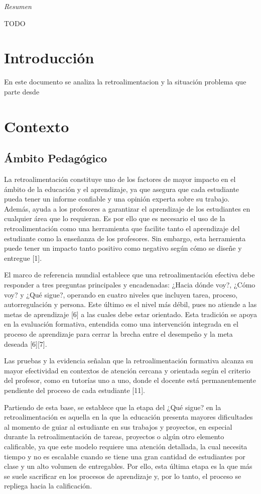 \documentclass[letterpaper, 10 pt, conference]{ieeeconf}
\begin{document}
\thispagestyle{empty}
\pagestyle{empty}


\textit{Resumen}

TODO 


\section{Introducción}

En este documento se analiza la retroalimentacion y la situación problema que parte desde 
\section{Contexto}
    \subsection{Ámbito Pedagógico} 
    La retroalimentación constituye uno de los factores de mayor impacto en el ámbito de la educación y el aprendizaje, ya que asegura que cada estudiante pueda tener un informe confiable y una opinión experta sobre su trabajo. Además, ayuda a los profesores a garantizar el aprendizaje de los estudiantes en cualquier área que lo requieran. Es por ello que es necesario el uso de la retroalimentación como una herramienta que facilite tanto el aprendizaje del estudiante como la enseñanza de los profesores. Sin embargo, esta herramienta puede tener un impacto tanto positivo como negativo según cómo se diseñe y entregue [1].

    El marco de referencia mundial establece que una retroalimentación efectiva debe responder a tres preguntas principales y encadenadas: ¿Hacia dónde voy?, ¿Cómo voy? y ¿Qué sigue?, operando en cuatro niveles que incluyen tarea, proceso, autorregulación y persona. Este último es el nivel más débil, pues no atiende a las metas de aprendizaje [6] a las cuales debe estar orientado. Esta tradición se apoya en la evaluación formativa, entendida como una intervención integrada en el proceso de aprendizaje para cerrar la brecha entre el desempeño y la meta deseada [6][7].

    Las pruebas y la evidencia señalan que la retroalimentación formativa alcanza su mayor efectividad en contextos de atención cercana y orientada según el criterio del profesor, como en tutorías uno a uno, donde el docente está permanentemente pendiente del proceso de cada estudiante [11].

    Partiendo de esta base, se establece que la etapa del ¿Qué sigue? en la retroalimentación es aquella en la que la educación presenta mayores dificultades al momento de guiar al estudiante en sus trabajos y proyectos, en especial durante la retroalimentación de tareas, proyectos o algún otro elemento calificable, ya que este modelo requiere una atención detallada, la cual necesita tiempo y no es escalable cuando se tiene una gran cantidad de estudiantes por clase y un alto volumen de entregables. Por ello, esta última etapa es la que más se suele sacrificar en los procesos de aprendizaje y, por lo tanto, el proceso se repliega hacia la calificación.
\end{document}
